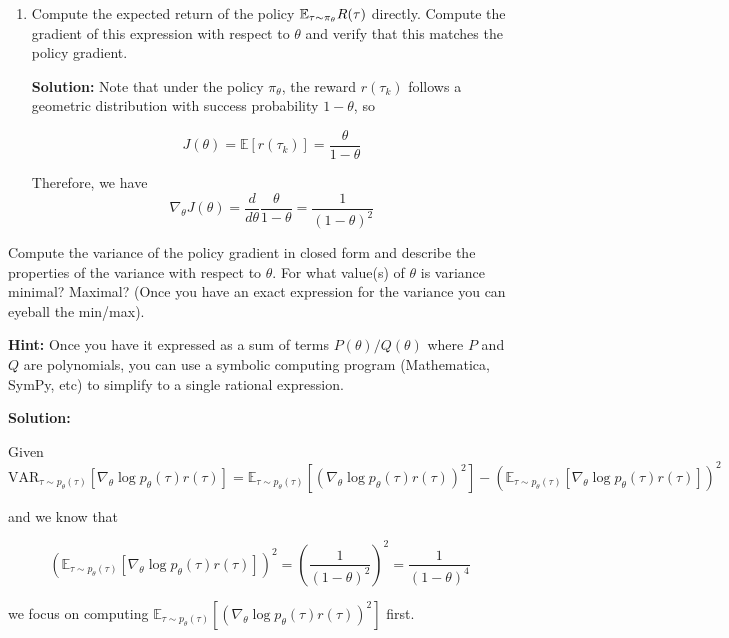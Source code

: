 \documentclass{article}
\begin{document}
\begin{enumerate}
\begin{enumerate}
    \item \label{exact_gradient} Compute the expected return of the policy $\mathbb{E}_{\tau \sim \pi_\theta} R(\tau)$ directly. Compute the gradient of this expression with respect to $\theta$ and verify that this matches the policy gradient.

\textbf{Solution:}
Note that under the policy $\pi_\theta$, the reward $r(\tau_k)$ follows a geometric distribution with success probability $1 - \theta$, so 

\[J(\theta) = \mathbb{E}[r(\tau_k)] = \frac{\theta}{1 - \theta}\]

Therefore, we have
\[\nabla_\theta J(\theta) = \frac{d}{d\theta} \frac{\theta}{1 - \theta} = \frac{1}{(1-\theta)^2} \]

\end{enumerate}
\newpage
{} Compute the variance of the policy gradient in closed form and describe the properties of the variance with respect to $\theta$. For what value(s) of $\theta$ is variance minimal? Maximal? (Once you have an exact expression for the variance you can eyeball the min/max).

\textbf{Hint:}  Once you have it expressed as a sum of terms $P(\theta)/Q(\theta)$ where $P$ and $Q$ are polynomials, you can use a symbolic computing program (Mathematica, SymPy, etc) to simplify to a single rational expression.

\textbf{Solution:}

Given 
\[\text{VAR}_{\tau \sim p_\theta(\tau)}[\nabla_\theta \log p_\theta(\tau) r(\tau)] = \mathbb{E}_{\tau \sim p_\theta(\tau)}[(\nabla_\theta \log p_\theta(\tau) r(\tau))^2] - (\mathbb{E}_{\tau \sim p_\theta(\tau)}[\nabla_\theta \log p_\theta(\tau) r(\tau)])^2\]

and we know that 

\[(\mathbb{E}_{\tau \sim p_\theta(\tau)}[\nabla_\theta \log p_\theta(\tau) r(\tau)])^2 = (\frac{1}{(1 - \theta)^2})^2 = \frac{1}{(1 - \theta)^4}\]

we focus on computing $\mathbb{E}_{\tau \sim p_\theta(\tau)}[(\nabla_\theta \log p_\theta(\tau) r(\tau))^2]$ first.


\end{enumerate}
\end{document}
